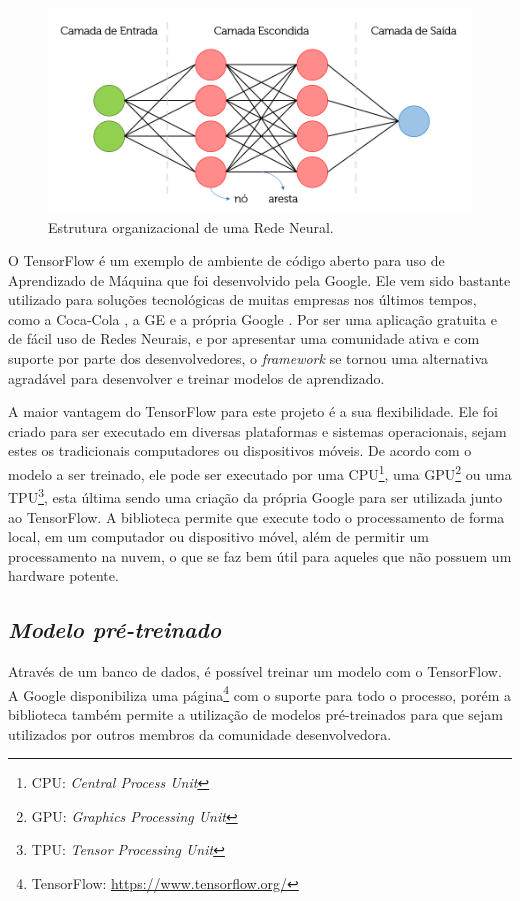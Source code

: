 \begin{figure}[h!]
    \centering
    \includegraphics[width=.75\columnwidth]{Imagens/RedeNeural.PNG}
    \caption{Estrutura organizacional de uma Rede Neural.}
    \label{fig:RedeNeural}
\end{figure}

O TensorFlow é um exemplo de ambiente de código aberto para uso de Aprendizado de Máquina que foi desenvolvido pela Google. Ele vem sido bastante utilizado para soluções tecnológicas de muitas empresas nos últimos tempos, como a Coca-Cola \cite{brandt_how_2017}, a GE \cite{polzin_intelligent_2019} e a própria Google \cite{bendersky_google_2021}. Por ser uma aplicação gratuita e de fácil uso de Redes Neurais, e por apresentar uma comunidade ativa e com suporte por parte dos desenvolvedores, o \textit{framework} se tornou uma alternativa agradável para desenvolver e treinar modelos de aprendizado.

A maior vantagem do TensorFlow para este projeto é a sua flexibilidade. Ele foi criado para ser executado em diversas plataformas e sistemas operacionais, sejam estes os tradicionais computadores ou dispositivos móveis. De acordo com o modelo a ser treinado, ele pode ser executado por uma CPU\footnote{CPU: \textit{Central Process Unit}}, uma GPU\footnote{GPU: \textit{Graphics Processing Unit}} ou uma TPU\footnote{TPU: \textit{Tensor Processing Unit}}, esta última sendo uma criação da própria Google para ser utilizada junto ao TensorFlow. A biblioteca permite que execute todo o processamento de forma local, em um computador ou dispositivo móvel, além de permitir um processamento na nuvem, o que se faz bem útil para aqueles que não possuem um hardware potente.


\subsection{\textit{Modelo pré-treinado}}\label{sec:Cap3_D_Modelo}

Através de um banco de dados, é possível treinar um modelo com o TensorFlow. A Google disponibiliza uma página\footnote{TensorFlow: \url{https://www.tensorflow.org/}} com o suporte para todo o processo, porém a biblioteca também permite a utilização de modelos pré-treinados para que sejam utilizados por outros membros da comunidade desenvolvedora.


